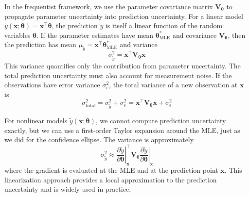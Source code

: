 In the frequentist framework, we use the parameter covariance matrix $\mathbf{V}_{\boldsymbol{\theta}}$ to propagate parameter uncertainty into prediction uncertainty. For a linear model $\tilde{y}(\mathbf{x}; \boldsymbol{\theta}) = \mathbf{x}^\top\boldsymbol{\theta}$, the prediction $\tilde{y}$ is itself a linear function of the random variables $\boldsymbol{\theta}$. If the parameter estimates have mean $\boldsymbol{\theta}^*_{\text{MLE}}$ and covariance $\mathbf{V}_{\boldsymbol{\theta}}$, then the prediction has mean $\mu_{\tilde{y}} = \mathbf{x}^\top\boldsymbol{\theta}^*_{\text{MLE}}$ and variance
\begin{equation}
    \sigma^2_{\tilde{y}} = \mathbf{x}^\top \mathbf{V}_{\boldsymbol{\theta}} \mathbf{x}
\end{equation}
This variance quantifies only the contribution from parameter uncertainty. The total prediction uncertainty must also account for measurement noise. If the observations have error variance $\sigma^2_{\epsilon}$, the total variance of a new observation at $\mathbf{x}$ is
\begin{equation}
    \sigma^2_{\text{total}} = \sigma^2_{\tilde{y}} + \sigma^2_{\epsilon} = \mathbf{x}^\top \mathbf{V}_{\boldsymbol{\theta}} \mathbf{x} + \sigma^2_{\epsilon}
\end{equation}

For nonlinear models $\tilde{y}(\mathbf{x}; \boldsymbol{\theta})$, we cannot compute prediction uncertainty exactly, but we can use a first-order Taylor expansion around the MLE, just as we did for the confidence ellipse. The variance is approximately
\begin{equation}
    \sigma^2_{\tilde{y}} \approx \left.\frac{\partial \tilde{y}}{\partial \boldsymbol{\theta}}\right|_{\mathbf{x}}^\top \mathbf{V}_{\boldsymbol{\theta}} \left.\frac{\partial \tilde{y}}{\partial \boldsymbol{\theta}}\right|_{\mathbf{x}}
\end{equation}
where the gradient is evaluated at the MLE and at the prediction point $\mathbf{x}$. This linearization approach provides a local approximation to the prediction uncertainty and is widely used in practice.


